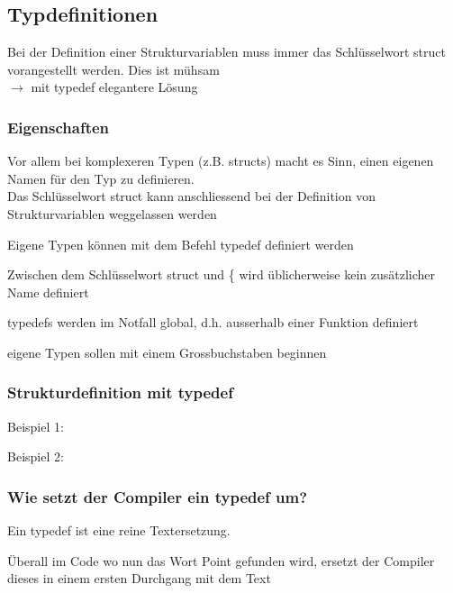 	\subsection{Typdefinitionen}
		Bei der Definition einer Strukturvariablen muss immer das Schlüsselwort struct vorangestellt werden. Dies ist mühsam\\ $\rightarrow$ mit typedef elegantere Lösung
		\subsubsection{Eigenschaften}
			\begin{compactitem}
				\item Vor allem bei komplexeren Typen (z.B. structs) macht es Sinn, einen eigenen Namen für den Typ zu definieren.\\ Das Schlüsselwort struct kann anschliessend bei der Definition von Strukturvariablen weggelassen werden
				\item Eigene Typen können mit dem Befehl typedef definiert werden
				\item Zwischen dem Schlüsselwort struct und \{ wird üblicherweise kein zusätzlicher Name definiert
				\item typedefs werden im Notfall global, d.h. ausserhalb einer Funktion definiert
				\item eigene Typen sollen mit einem Grossbuchstaben beginnen 
			\end{compactitem} 
		\subsubsection{Strukturdefinition mit typedef}
			Beispiel 1:
			
			\vspace*{0.5cm}
			Beispiel 2: 
			
		\subsubsection{Wie setzt der Compiler ein typedef um?}
			Ein typedef ist eine reine Textersetzung. 
			
			Überall im Code wo nun das Wort Point gefunden wird, ersetzt der Compiler dieses in einem ersten Durchgang mit dem Text
			 